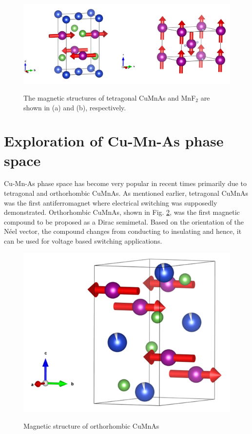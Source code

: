 \documentclass[11pt,edeposit,draftthesis]{uiucthesis2020}
\begin{document}
\begin{mainmatter}
\begin{figure}
\centering\includegraphics[width=\columnwidth]{figures/ch1/CuMnAs-MnF2.png} \\
\caption{\label{fig:tet-CuMnAs}
The magnetic structures of tetragonal CuMnAs and MnF$_2$ are shown in (a) and (b), respectively.
}
\end{figure}

\section{Exploration of Cu-Mn-As phase space}

Cu-Mn-As phase space has become very popular in recent times primarily due to tetragonal and orthorhombic CuMnAs. As mentioned earlier, tetragonal CuMnAs was the first antiferromagnet where electrical switching was supposedly demonstrated. Orthorhombic CuMnAs, shown in Fig. \ref{fig:ort-CuMnAs}, was the first magnetic compound to be proposed as a Dirac semimetal. Based on the orientation of the N\'eel vector, the compound changes from conducting to insulating and hence, it can be used for voltage based switching applications.

\begin{figure}
\centering\includegraphics[width=0.5\columnwidth]{figures/ch1/ort-CuMnAs.png} \\
\caption{\label{fig:ort-CuMnAs}
Magnetic structure of orthorhombic CuMnAs
}
\end{figure}



\end{mainmatter}
\end{document}
